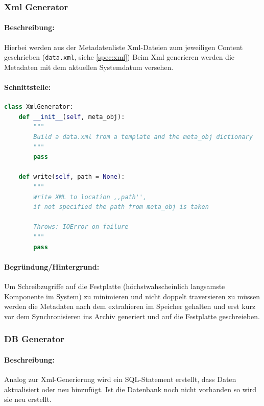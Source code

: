 \subsubsection{Xml Generator}
\label{ssub:xmlgen}
\paragraph{Beschreibung:}
\label{par:beschreibung_}
Hierbei werden aus der Metadatenliste Xml-Dateien zum jeweiligen Content
geschrieben (\texttt{data.xml}, siehe \ref{spec:xml}) 
Beim Xml generieren werden die Metadaten mit dem aktuellen Systemdatum versehen.
\paragraph{Schnittstelle:}
\label{par:schnittstelle_}

\begin{lstlisting}[language=python]
class XmlGenerator:
    def __init__(self, meta_obj):
        """
        Build a data.xml from a template and the meta_obj dictionary
        """
        pass

    def write(self, path = None):
        """
        Write XML to location ,,path'', 
        if not specified the path from meta_obj is taken

        Throws: IOError on failure
        """
        pass
\end{lstlisting}
\paragraph{Begründung/Hintergrund:}
\label{par:begr_ndung_hintergrund_}
Um Schreibzugriffe auf die Festplatte (höchstwahscheinlich langsamste Komponente im System) zu minimieren
und nicht doppelt traversieren zu müssen werden die Metadaten nach dem extrahieren im Speicher gehalten und
erst kurz vor dem Synchronisieren ins Archiv generiert und auf die Festplatte geschreieben. 


\subsubsection{DB Generator}
\label{ssub:dbgen}
\paragraph{Beschreibung:}
\label{par:beschreibung_}
Analog zur Xml-Generierung wird ein SQL-Statement erstellt, dass Daten aktualisiert oder neu hinzufügt.
Ist die Datenbank noch nicht vorhanden so wird sie neu erstellt.

